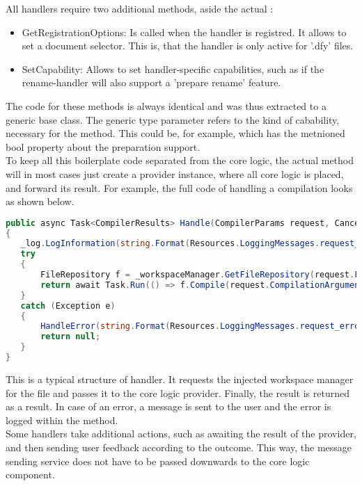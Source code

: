 All handlers require two additional methods, aside the actual :
\begin{itemize}
    \item GetRegistrationOptions: Is called when the handler is registred. It allows to set a document selector. This is, that the handler is only active for '.dfy' files.
    \item SetCapability: Allows to set handler-specific capabilities, such as if the rename-handler will also support a 'prepare rename' feature.
\end{itemize}
The code for these methods is always identical and was thus extracted to a generic base class. The generic type parameter refers to the kind of cabability, necessary for the  method. This could be, for example,  which has the metnioned bool property about the preparation support.\\

To keep all this boilerplate code separated from the core logic, the actual  method will in most cases just create a provider instance, where all core logic is placed, and forward its result. For example, the full code of handling a compilation looks as shown below.

\begin{lstlisting}[language=csharp, caption={Handling Compilation}, captionpos=b, label={lst:handlecompilation}]
public async Task<CompilerResults> Handle(CompilerParams request, CancellationToken cancellationToken)
{
   _log.LogInformation(string.Format(Resources.LoggingMessages.request_handle, _method));
   try
   {
       FileRepository f = _workspaceManager.GetFileRepository(request.FileToCompile);
       return await Task.Run(() => f.Compile(request.CompilationArguments), cancellationToken);
   }
   catch (Exception e)
   {
       HandleError(string.Format(Resources.LoggingMessages.request_error, _method), e);
       return null;
   }
}
\end{lstlisting}

This is a typical structure of handler. It requests the injected workspace manager for the file and passes it to the core logic provider. Finally, the result is returned as a result. In case of an error, a message is sent to the user and the error is logged within the  method.\\

Some handlers take additional actions, such as awaiting the result of the provider, and then sending user feedback according to the outcome. This way, the message sending service does not have to be passed downwards to the core logic component.

